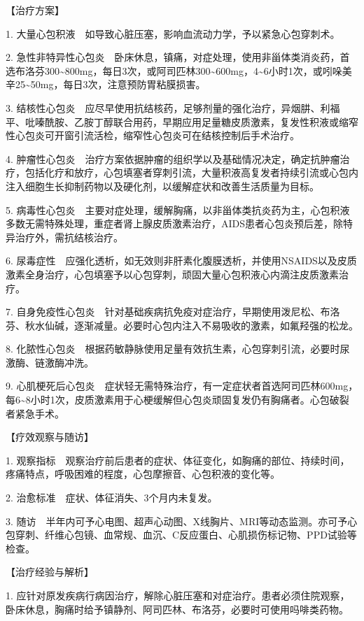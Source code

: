 【治疗方案】

1. 大量心包积液　如导致心脏压塞，影响血流动力学，予以紧急心包穿刺术。

2.
急性非特异性心包炎　卧床休息，镇痛，对症处理，使用非甾体类消炎药，首选布洛芬300\textasciitilde{}800mg，每日3次，或阿司匹林300\textasciitilde{}600mg，4\textasciitilde{}6小时1次，或吲哚美辛25\textasciitilde{}50mg，每日3次，注意预防胃粘膜损害。

3.
结核性心包炎　应尽早使用抗结核药，足够剂量的强化治疗，异烟肼、利福平、吡嗪酰胺、乙胺丁醇联合用药，早期应用足量糖皮质激素，复发性积液或缩窄性心包炎可开窗引流活检，缩窄性心包炎可在结核控制后手术治疗。

4.
肿瘤性心包炎　治疗方案依据肿瘤的组织学以及基础情况决定，确定抗肿瘤治疗，包括化疗和放疗，心包填塞者穿刺引流，大量积液高复发者持续引流或心包内注入细胞生长抑制药物以及硬化剂，以缓解症状和改善生活质量为目标。

5.
病毒性心包炎　主要对症处理，缓解胸痛，以非甾体类抗炎药为主，心包积液多数无需特殊处理，重症者肾上腺皮质激素治疗，AIDS患者心包炎预后差，除特异治疗外，需抗结核治疗。

6.
尿毒症性　应强化透析，如无效则非肝素化腹膜透析，并使用NSAIDS以及皮质激素全身治疗，心包填塞予以心包穿刺，顽固大量心包积液心内滴注皮质激素治疗。

7.
自身免疫性心包炎　针对基础疾病抗免疫对症治疗，早期使用泼尼松、布洛芬、秋水仙碱，逐渐减量。必要时心包内注入不易吸收的激素，如氟羟强的松龙。

8.
化脓性心包炎　根据药敏静脉使用足量有效抗生素，心包穿刺引流，必要时尿激酶、链激酶冲洗。

9.
心肌梗死后心包炎　症状轻无需特殊治疗，有一定症状者首选阿司匹林600mg，每6\textasciitilde{}8小时1次，皮质激素用于心梗缓解但心包炎顽固复发仍有胸痛者。心包破裂者紧急手术。

【疗效观察与随访】

1.
观察指标　观察治疗前后患者的症状、体征变化，如胸痛的部位、持续时间，疼痛特点，呼吸困难的程度，心包摩擦音、心包积液的变化等。

2. 治愈标准　症状、体征消失、3个月内未复发。

3.
随访　半年内可予心电图、超声心动图、X线胸片、MRI等动态监测。亦可予心包穿刺、纤维心包镜、血常规、血沉、C反应蛋白、心肌损伤标记物、PPD试验等检查。

【治疗经验与解析】

1.
应针对原发疾病行病因治疗，解除心脏压塞和对症治疗。患者必须住院观察，卧床休息，胸痛时给予镇静剂、阿司匹林、布洛芬，必要时可使用吗啡类药物。

